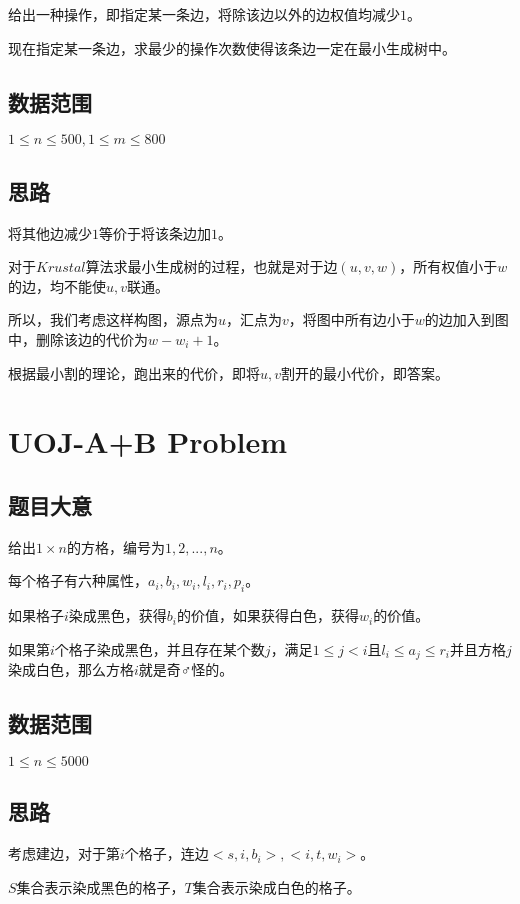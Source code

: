 \documentclass{ctexart}
\numberwithin{equation}{section}
\begin{document}
\begin{flushleft}
  给出一种操作，即指定某一条边，将除该边以外的边权值均减少$1$。

  现在指定某一条边，求最少的操作次数使得该条边一定在最小生成树中。
  
  \subsection{数据范围}
  $1\le n \le 500,1\le m\le 800$
  
  \subsection{思路}
  将其他边减少$1$等价于将该条边加$1$。

  对于$Krustal$算法求最小生成树的过程，也就是对于边$(u,v,w)$，所有权值小于$w$的边，均不能使$u,v$联通。

  所以，我们考虑这样构图，源点为$u$，汇点为$v$，将图中所有边小于$w$的边加入到图中，删除该边的代价为$w-w_i+1$。

  根据最小割的理论，跑出来的代价，即将$u,v$割开的最小代价，即答案。

  \newpage

  \section{UOJ-A+B Problem}
  \subsection{题目大意}
  给出$1\times n$的方格，编号为$1,2,...,n$。

  每个格子有六种属性，$a_i,b_i,w_i,l_i,r_i,p_i$。

  如果格子$i$染成黑色，获得$b_i$的价值，如果获得白色，获得$w_i$的价值。

  如果第$i$个格子染成黑色，并且存在某个数$j$，满足$1\le j < i$且$l_i \le a_j \le r_i$并且方格$j$染成白色，那么方格$i$就是奇$\male$怪的。
  
  \subsection{数据范围}
  $1\le n \le 5000$
  
  \subsection{思路}
  考虑建边，对于第$i$个格子，连边$<s,i,b_i>,<i,t,w_i>$。

  $S$集合表示染成黑色的格子，$T$集合表示染成白色的格子。


\end{flushleft}
\end{document}
